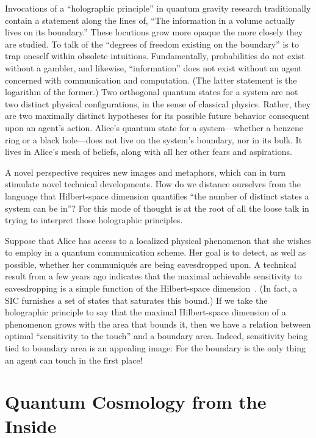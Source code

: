 \documentclass[aps,pra,superscriptaddress,10pt,tightenlines,twocolumn,nofootinbib]{revtex4}
\begin{document}
Invocations of a ``holographic principle'' in quantum gravity research
traditionally contain a statement along the lines of, ``The
information in a volume actually lives on its boundary.''  These
locutions grow more opaque the more closely they are studied.  To talk
of the ``degrees of freedom existing on the boundary'' is to trap
oneself within obsolete intuitions.  Fundamentally, probabilities do
not exist without a gambler, and likewise, ``information'' does not
exist without an agent concerned with communication and computation.
(The latter statement is the logarithm of the former.)  Two orthogonal
quantum states for a system are not two distinct physical
configurations, in the sense of classical physics.  Rather, they are
two maximally distinct hypotheses for its possible future behavior
consequent upon an agent's action.  Alice's quantum state for a
system---whether a benzene ring or a black hole---does not live on the system's boundary, nor in its bulk.  It lives in Alice's mesh of beliefs, along with all her other fears and aspirations.

A novel perspective requires new images and metaphors, which can in turn stimulate novel technical developments.  How do we distance ourselves from the language that Hilbert-space dimension quantifies ``the number of distinct states a system can be in''?  For this mode of thought is at the root of all the loose talk in trying to interpret those holographic principles.

Suppose that Alice has access to a localized physical phenomenon that she wishes to employ in a quantum communication scheme.  Her goal is to detect, as well as possible, whether her communiqu\'es are being eavesdropped upon.  A technical result from a few years ago indicates that the maximal achievable sensitivity to eavesdropping is a simple function of the Hilbert-space dimension~\cite{Fuchs03}.  (In fact, a SIC furnishes a set of states that saturates this bound.)  If we take the holographic principle to say that the maximal Hilbert-space dimension of a phenomenon grows with the area that bounds it, then we have a relation between optimal ``sensitivity to the touch'' and a boundary area.  Indeed, sensitivity being tied to boundary area is an appealing image: For the boundary is the only thing an agent can touch in the first place!

\section{Quantum Cosmology from the Inside}
\end{document}
